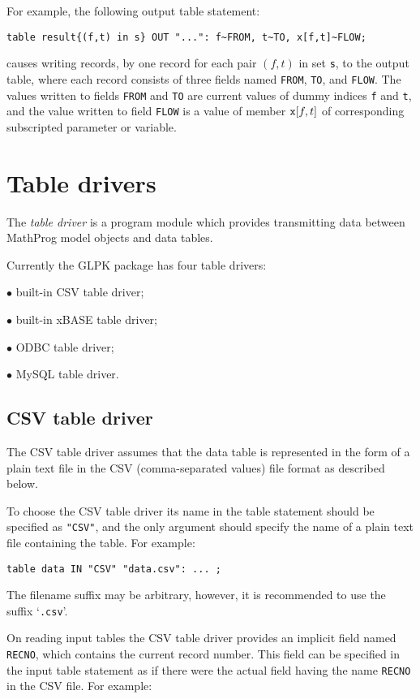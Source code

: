 \documentclass[11pt,draft]{article}
\begin{document}
For example, the following output table statement:

\begin{verbatim}
table result{(f,t) in s} OUT "...": f~FROM, t~TO, x[f,t]~FLOW;
\end{verbatim}

\noindent
causes writing records, by one record for each pair $(f,t)$ in set
{\tt s}, to the output table, where each record consists of three
fields named {\tt FROM}, {\tt TO}, and {\tt FLOW}. The values written
to fields {\tt FROM} and {\tt TO} are current values of dummy indices
{\tt f} and {\tt t}, and the value written to field {\tt FLOW} is
a value of member ${\tt x}[f,t]$ of corresponding subscripted parameter
or variable.

\section*{Table drivers}

The {\it table driver} is a program module which provides transmitting
data between MathProg model objects and data tables.

Currently the GLPK package has four table drivers:

$\bullet$ built-in CSV table driver;

$\bullet$ built-in xBASE table driver;

$\bullet$ ODBC table driver;

$\bullet$ MySQL table driver.

\subsection*{CSV table driver}

The CSV table driver assumes that the data table is represented in the
form of a plain text file in the CSV (comma-separated values) file
format as described below.

To choose the CSV table driver its name in the table statement should
be specified as \verb|"CSV"|, and the only argument should specify the
name of a plain text file containing the table. For example:

\begin{verbatim}
table data IN "CSV" "data.csv": ... ;
\end{verbatim}

The filename suffix may be arbitrary, however, it is recommended to use
the suffix `\verb|.csv|'.

On reading input tables the CSV table driver provides an implicit field
named \verb|RECNO|, which contains the current record number. This field
can be specified in the input table statement as if there were the
actual field having the name \verb|RECNO| in the CSV file. For example:
\end{document}
